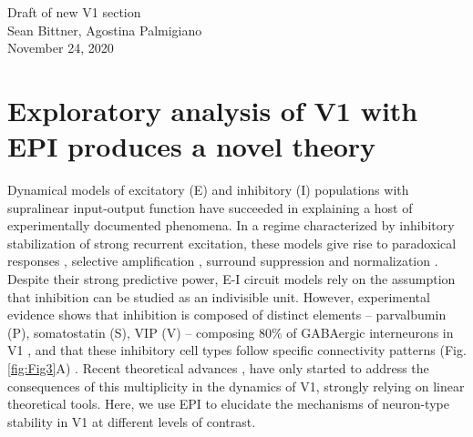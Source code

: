 \documentclass[11pt]{article}
\begin{document}
\medskip                        %

\thispagestyle{plain}
\begin{center}                  %
{\Large Draft of new V1 section} \\
Sean Bittner, Agostina Palmigiano \\
November 24, 2020 \\
\end{center}

\section{Exploratory analysis of V1 with EPI produces a novel theory}\label{results_V1}
Dynamical models of excitatory (E) and inhibitory (I) populations with supralinear input-output function have succeeded in explaining a host of experimentally documented phenomena.
In a regime characterized by inhibitory stabilization of strong recurrent excitation, these models give rise to paradoxical responses \cite{tsodyks1997paradoxical}, selective amplification  \cite{goldman2009memory, murphy2009balanced}, surround suppression \cite{ozeki2009inhibitory} and normalization \cite{rubin2015stabilized}. 
Despite their strong predictive power, E-I circuit models rely on the assumption that inhibition can be studied as an indivisible unit. 
However, experimental evidence shows that inhibition is composed of distinct elements -- parvalbumin (P), somatostatin (S), VIP (V) --
composing 80\% of GABAergic interneurons in V1 \cite{markram2004interneurons, rudy2011three, tremblay2016}, and that these inhibitory cell types follow specific connectivity patterns (Fig. \ref{fig:Fig3}A) \cite{pfeffer2013inhibition}.
Recent theoretical advances \cite{litwin2016inhibitory, GarciaDelMolino2017, Chen2019},  have only started to address the consequences of this multiplicity in the dynamics of V1, strongly relying on linear theoretical tools. 
Here, we use EPI to elucidate the mechanisms of neuron-type stability in V1 at different levels of contrast.
\end{document}
